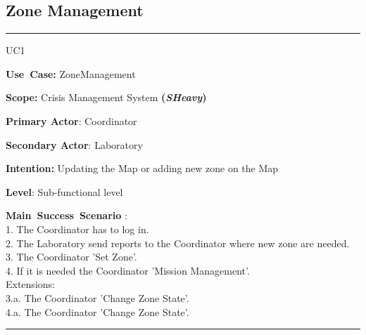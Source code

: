 \subsection{Zone Management}
\vspace{0.5cm}
\hrule
\vspace{0.5cm}
\begin{lyxlist}{UC1}
\small{
\item [\textbf{Use~Case:}] ZoneManagement
\item [\textbf{Scope:}] Crisis Management System \textbf{(\emph{SHeavy})}
\item [\textbf{Primary Actor}:] Coordinator
\item [\textbf{Secondary Actor}:] Laboratory
\item [\textbf{Intention:}] Updating the Map or adding new zone on the Map
\item [\textbf{Level}:]Sub-functional level
\item [\textbf{Main~Success~Scenario}]:\\
1. The Coordinator has to log in.\\
2. The Laboratory send reports to the Coordinator where new zone are needed.\\
3. The Coordinator 'Set Zone'.\\
4. If it is needed the Coordinator 'Mission Management'.\\
Extensions:\\
	3.a. The Coordinator 'Change Zone State'.\\
	4.a. The Coordinator 'Change Zone State'.\\
}
\end{lyxlist}
\hrule
\vspace{0.5cm} 

